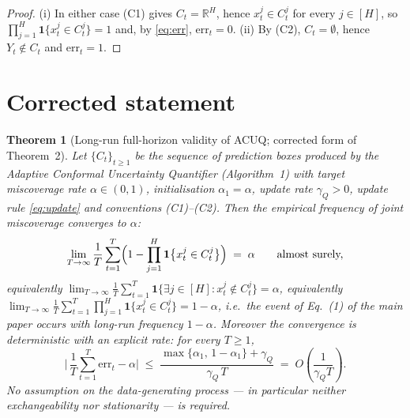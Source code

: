 \documentclass[11pt]{article}
\newtheorem{theorem}{Theorem}
\theoremstyle{definition}
\theoremstyle{remark}
\newcommand{\R}{\mathbb{R}}
\newcommand{\ind}{\mathbf{1}}
\newcommand{\err}{\mathrm{err}}
\newcommand{\horizon}{[H]}
\begin{document}
\begin{proof}
(i) In either case (C1) gives $C_t=\R^{H}$, hence $x_t^{j}\in C_t^{j}$ for every $j\in\horizon$,
so $\prod_{j=1}^{H}\ind\{x_t^{j}\in C_t^{j}\}=1$ and, by \eqref{eq:err},
$\err_t=0$. (ii) By (C2), $C_t=\emptyset$, hence $Y_t\notin C_t$ and
$\err_t=1$.
\end{proof}

\section{Corrected statement}
\label{sec:statement}

\begin{theorem}[Long-run full-horizon validity of ACUQ; corrected form of
Theorem~2]
\label{thm:main}
Let $\{C_t\}_{t\ge1}$ be the sequence of prediction boxes produced by the
Adaptive Conformal Uncertainty Quantifier (Algorithm~1) with target
miscoverage rate $\alpha\in(0,1)$, initialisation $\alpha_1=\alpha$, update
rate $\gamma_Q>0$, update rule \eqref{eq:update} and conventions
(C1)--(C2). Then the empirical frequency of \emph{joint} miscoverage converges
to $\alpha$:
\begin{equation}
  \lim_{T\to\infty}\frac{1}{T}\sum_{t=1}^{T}
  \Bigl(1-\prod_{j=1}^{H}\ind\bigl\{x_t^{j}\in C_t^{j}\bigr\}\Bigr)
  \;=\;\alpha
  \qquad\text{almost surely,}
  \label{eq:main}
\end{equation}
equivalently
$\displaystyle\lim_{T\to\infty}\frac{1}{T}\sum_{t=1}^{T}
\ind\{\exists j\in\horizon: x_t^{j}\notin C_t^{j}\}=\alpha$, equivalently
$\displaystyle\lim_{T\to\infty}\frac{1}{T}\sum_{t=1}^{T}
\prod_{j=1}^{H}\ind\{x_t^{j}\in C_t^{j}\}=1-\alpha$,
i.e.\ the event of Eq.~(1) of the main paper occurs with long-run frequency
$1-\alpha$. Moreover the convergence is \emph{deterministic} with an explicit
rate: for every $T\ge1$,
\begin{equation}
  \Biggl\lvert\,\frac{1}{T}\sum_{t=1}^{T}\err_t-\alpha\Biggr\rvert
  \;\le\;\frac{\max\{\alpha_1,\,1-\alpha_1\}+\gamma_Q}{\gamma_Q\,T}
  \;=\;O\!\left(\frac{1}{\gamma_Q T}\right).
  \label{eq:rate}
\end{equation}
No assumption on the data-generating process --- in particular neither
exchangeability nor stationarity --- is required.
\end{theorem}
\end{document}
